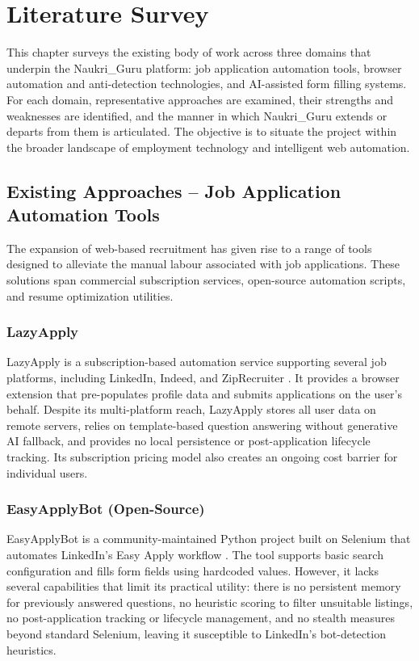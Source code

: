 \documentclass[12pt, a4paper, oneside]{report}
\begin{document}
\chapter{Literature Survey}
\label{chap:literature}

This chapter surveys the existing body of work across three domains that underpin the Naukri\_Guru platform: job application automation tools, browser automation and anti-detection technologies, and AI-assisted form filling systems. For each domain, representative approaches are examined, their strengths and weaknesses are identified, and the manner in which Naukri\_Guru extends or departs from them is articulated. The objective is to situate the project within the broader landscape of employment technology and intelligent web automation.

\section{Existing Approaches -- Job Application Automation Tools}
\label{sec:category-a}

The expansion of web-based recruitment has given rise to a range of tools designed to alleviate the manual labour associated with job applications. These solutions span commercial subscription services, open-source automation scripts, and resume optimization utilities.

\subsection{LazyApply}
LazyApply is a subscription-based automation service supporting several job platforms, including LinkedIn, Indeed, and ZipRecruiter \cite{ref2}. It provides a browser extension that pre-populates profile data and submits applications on the user's behalf. Despite its multi-platform reach, LazyApply stores all user data on remote servers, relies on template-based question answering without generative AI fallback, and provides no local persistence or post-application lifecycle tracking. Its subscription pricing model also creates an ongoing cost barrier for individual users.

\subsection{EasyApplyBot (Open-Source)}
EasyApplyBot is a community-maintained Python project built on Selenium that automates LinkedIn's Easy Apply workflow \cite{ref3}. The tool supports basic search configuration and fills form fields using hardcoded values. However, it lacks several capabilities that limit its practical utility: there is no persistent memory for previously answered questions, no heuristic scoring to filter unsuitable listings, no post-application tracking or lifecycle management, and no stealth measures beyond standard Selenium, leaving it susceptible to LinkedIn's bot-detection heuristics.
\end{document}
